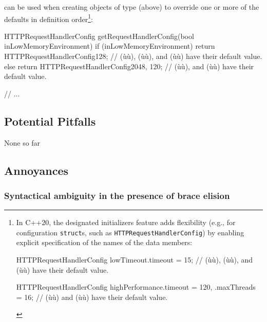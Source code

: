 \noindent {} can be used when creating objects of
type  (above) to override one or more
of the defaults in definition order{\cprotect\footnote{In C++20, the
designated initializers feature adds flexibility (e.g., for
configuration \lstinline!struct!s, such as
\lstinline!HTTPRequestHandlerConfig!) by enabling explicit specification
of the names of the data members:

\begin{emcppslisting}[language=C++, basicstyle={\ttfamily\footnotesize}]
HTTPRequestHandlerConfig lowTimeout{.timeout = 15};
    // (ù{}ù), (ù{}ù), and (ù{}ù) have their default value.

HTTPRequestHandlerConfig highPerformance{.timeout = 120, .maxThreads = 16};
    // (ù{}ù) and (ù{}ù) have their default value.
\end{emcppslisting}
      }}:

\begin{emcppslisting}[language=C++]
HTTPRequestHandlerConfig getRequestHandlerConfig(bool inLowMemoryEnvironment)
{
    if (inLowMemoryEnvironment)
    {
        return HTTPRequestHandlerConfig{128};
            // (ù{}ù), (ù{}ù), and (ù{}ù) have their default value.
    }
    else
    {
        return HTTPRequestHandlerConfig{2048, 120};
            // (ù{}ù), and (ù{}ù) have their default value.
    }
}

// ...
\end{emcppslisting}


\subsection[Potential Pitfalls]{Potential Pitfalls}\label{potential-pitfalls}

None so far

\subsection[Annoyances]{Annoyances}\label{annoyances}

\subsubsection[Syntactical ambiguity in the presence of brace elision]{Syntactical ambiguity in the presence of brace elision}\label{syntactical-ambiguity-in-the-presence-of-brace-elision}


